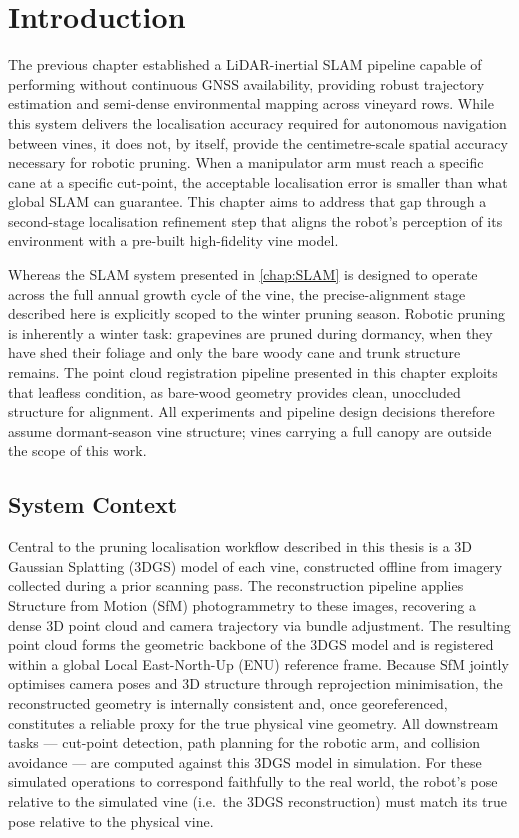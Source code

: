 \section{Introduction}
\label{sec:precise-alignment-intro}

The previous chapter established a LiDAR-inertial SLAM pipeline capable of performing without continuous GNSS availability, providing robust trajectory estimation and semi-dense environmental mapping across vineyard rows. While this system delivers the localisation accuracy required for autonomous navigation between vines, it does not, by itself, provide the centimetre-scale spatial accuracy necessary for robotic pruning. When a manipulator arm must reach a specific cane at a specific cut-point, the acceptable localisation error is smaller than what global SLAM can guarantee. This chapter aims to address that gap through a second-stage localisation refinement step that aligns the robot's perception of its environment with a pre-built high-fidelity vine model.

Whereas the SLAM system presented in \cref{chap:SLAM} is designed to operate across the full annual growth cycle of the vine, the precise-alignment stage described here is explicitly scoped to the winter pruning season. Robotic pruning is inherently a winter task: grapevines are pruned during dormancy, when they have shed their foliage and only the bare woody cane and trunk structure remains. The point cloud registration pipeline presented in this chapter exploits that leafless condition, as bare-wood geometry provides clean, unoccluded structure for alignment. All experiments and pipeline design decisions therefore assume dormant-season vine structure; vines carrying a full canopy are outside the scope of this work.

\subsection{System Context}
\label{subsec:system-context}

Central to the pruning localisation workflow described in this thesis is a 3D Gaussian Splatting (3DGS) model of each vine, constructed offline from imagery collected during a prior scanning pass. The reconstruction pipeline applies Structure from Motion (SfM) photogrammetry to these images, recovering a dense 3D point cloud and camera trajectory via bundle adjustment. The resulting point cloud forms the geometric backbone of the 3DGS model and is registered within a global Local East-North-Up (ENU) reference frame. Because SfM jointly optimises camera poses and 3D structure through reprojection minimisation, the reconstructed geometry is internally consistent and, once georeferenced, constitutes a reliable proxy for the true physical vine geometry. All downstream tasks — cut-point detection, path planning for the robotic arm, and collision avoidance — are computed against this 3DGS model in simulation. For these simulated operations to correspond faithfully to the real world, the robot's pose relative to the simulated vine (i.e.\ the 3DGS reconstruction) must match its true pose relative to the physical vine.

